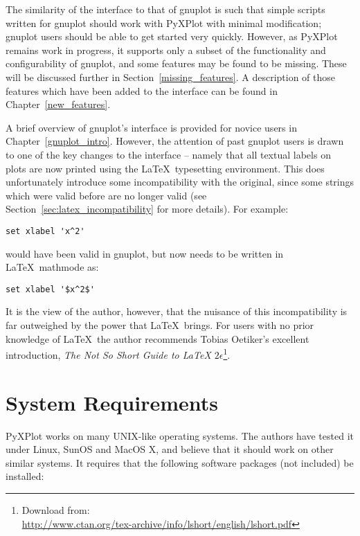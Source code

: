 The similarity of the interface to that of gnuplot is such that simple scripts
written for gnuplot should work with PyXPlot with minimal modification; gnuplot
users should be able to get started very quickly.  However, as PyXPlot remains
work in progress, it supports only a subset of the functionality and
configurability of gnuplot, and some features may be found to be missing.
These will be discussed further in Section~\ref{missing_features}. A
description of those features which have been added to the interface can be
found in Chapter~\ref{new_features}.

A brief overview of gnuplot's interface is provided for novice users in
Chapter~\ref{gnuplot_intro}. However, the attention of past gnuplot users is
drawn to one of the key changes to the interface -- namely that all textual
labels on plots are now printed using the \LaTeX\ typesetting environment. This
does unfortunately introduce some incompatibility with the original, since some
strings which were valid before are no longer valid (see
Section~\ref{sec:latex_incompatibility} for more details). For example:

\begin{verbatim}set xlabel 'x^2'\end{verbatim}

\noindent would have been valid in gnuplot, but now needs to be written in
\LaTeX\ mathmode as:

\begin{verbatim}set xlabel '$x^2$'\end{verbatim}

\noindent It is the view of the author, however, that the nuisance of this
incompatibility is far outweighed by the power that \LaTeX\ brings. For users
with no prior knowledge of \LaTeX\ the author recommends Tobias Oetiker's
excellent introduction, \textit{The Not So Short Guide to \LaTeX
$2\epsilon$}\footnote{Download from:\\
\url{http://www.ctan.org/tex-archive/info/lshort/english/lshort.pdf}}.

\section{System Requirements}

PyXPlot works on many UNIX-like operating systems. The authors have tested it
under Linux, SunOS and MacOS X, and believe that it should work on other
similar systems. It requires that the following software packages (not
included) be installed:

